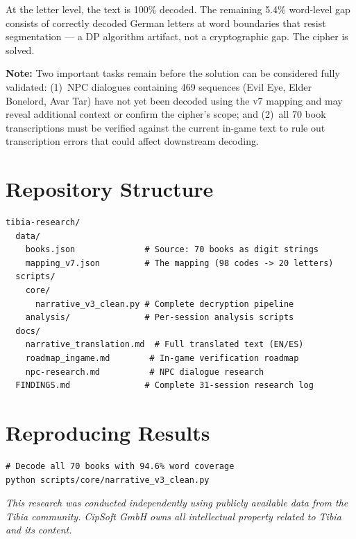 \documentclass[11pt,a4paper]{article}
\begin{document}
At the letter level, the text is 100\% decoded. The remaining 5.4\% word-level gap consists of correctly decoded German letters at word boundaries that resist segmentation --- a DP algorithm artifact, not a cryptographic gap. The cipher is solved.

\textbf{Note:} Two important tasks remain before the solution can be considered fully validated: (1)~NPC dialogues containing 469 sequences (Evil Eye, Elder Bonelord, Avar Tar) have not yet been decoded using the v7 mapping and may reveal additional context or confirm the cipher's scope; and (2)~all 70 book transcriptions must be verified against the current in-game text to rule out transcription errors that could affect downstream decoding.

\appendix

\section{Repository Structure}

\begin{lstlisting}[style=plain]
tibia-research/
  data/
    books.json              # Source: 70 books as digit strings
    mapping_v7.json         # The mapping (98 codes -> 20 letters)
  scripts/
    core/
      narrative_v3_clean.py # Complete decryption pipeline
    analysis/               # Per-session analysis scripts
  docs/
    narrative_translation.md  # Full translated text (EN/ES)
    roadmap_ingame.md        # In-game verification roadmap
    npc-research.md          # NPC dialogue research
  FINDINGS.md               # Complete 31-session research log
\end{lstlisting}

\section{Reproducing Results}

\begin{lstlisting}[style=bash]
# Decode all 70 books with 94.6% word coverage
python scripts/core/narrative_v3_clean.py
\end{lstlisting}

\vfill
\begin{center}
\textit{This research was conducted independently using publicly available data from the Tibia community. CipSoft GmbH owns all intellectual property related to Tibia and its content.}
\end{center}
\end{document}
